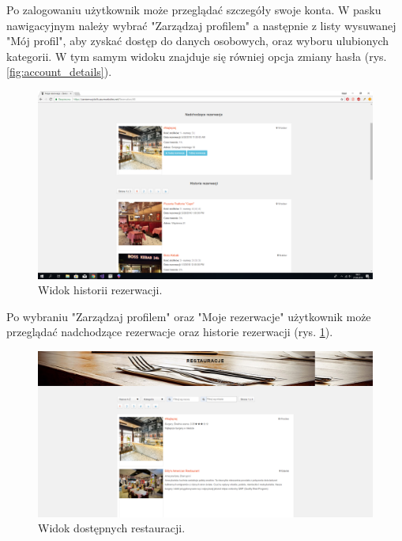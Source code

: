 \documentclass{article}
\begin{document}
Po zalogowaniu użytkownik może przeglądać szczegóły swoje konta. W pasku nawigacyjnym należy wybrać "Zarządzaj profilem" a następnie z listy wysuwanej "Mój profil", aby zyskać dostęp do danych osobowych, oraz wyboru ulubionych kategorii. W tym samym widoku znajduje się równiej opcja zmiany hasła (rys. \ref{fig:account_details}).

\begin{figure}[H]
\centering
	\includegraphics[width=1.00\textwidth]{screens/reservations_history.png}
	\caption{Widok historii rezerwacji.}
	\label{fig:account_reservations_history}
\end{figure}

Po wybraniu "Zarządzaj profilem" oraz "Moje rezerwacje" użytkownik może przeglądać nadchodzące rezerwacje oraz historie rezerwacji (rys. \ref{fig:account_reservations_history}).

\begin{figure}[H]
\centering
	\includegraphics[width=1.00\textwidth]{screens/restaurants.png}
	\caption{Widok dostępnych restauracji.}
	\label{fig:restaurants}
\end{figure}
\end{document}
